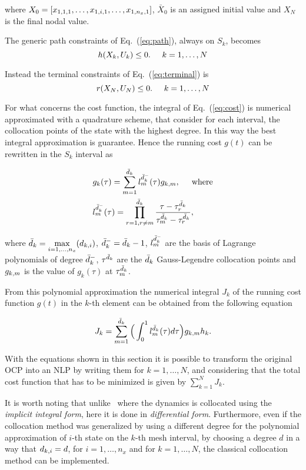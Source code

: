 where $X_0 = [x_{1,1,1}, \dots, x_{1,i,1}, \dots, x_{1,n_{x},1}]$, $\bar{X}_{0}$ is an assigned initial value and $X_{N}$ is the final nodal value.
 
 
The generic path constraints of Eq.~(\ref{eq:path}), always on $S_k$, becomes
\begin{equation}\label{eq:nlpath}
h(X_k, U_k) \leq 0. \hspace{5mm} k = 1, \dots, N
\end{equation}

Instead the terminal constraints of Eq.~(\ref{eq:terminal}) is
\begin{equation}\label{eq:npterminal}
	r(X_N, U_N) \leq 0. \hspace{5mm} k = 1, \dots, N
\end{equation}

For what concerns the cost function, the integral of Eq.~(\ref{eq:cost}) is numerical approximated with a quadrature scheme, that consider for each interval, the collocation points of the state with the highest degree. In this way the best integral approximation is guarantee. Hence the running cost $g(t)$ can be rewritten in the $S_k$ interval as

\begin{subequations}
	\begin{align}
	& g_k(\tau) = \sum_{m=1}^{\bar{d}_k} l_{m}^{\bar{d}_{k}^{-}}(\tau)g_{k,m}, \hspace{5mm} \text{where} \label{eq:nlpcost}\\
	&  l_{m}^{\bar{d}_{k}^{-}} (\tau) = \prod_{r=1, r\neq m}^{\bar{d}_k} \dfrac{\tau - \tau^{\bar{d}_{k}}_{r}}{\tau^{\bar{d}_{k}}_{m} - \tau^{\bar{d}_{k}}_{r}}, \label{eq:nlplm}
	\end{align}
\end{subequations}

where $\bar{d}_k = \max\limits_{i= 1, \dots, n_x}(d_{k,i})$, $\bar{d}_k^{-} = \bar{d}_k -1$, $l_{m}^{\bar{d}_{k}^{-}}$ are the basis of Lagrange polynomials of degree $\bar{d}_k^{-}$, $\tau^{\bar{d}_{k}}$ are the $\bar{d}_k$ Gauss-Legendre collocation points and $g_{k,m}$ is the value of $g_k (\tau)$ at $\tau^{\bar{d}_{k}}_{m}$.

From this polynomial approximation the numerical integral $J_k$ of the running cost function $g(t)$ in the $k$-th element can be obtained from the following equation

\begin{equation}\label{eq:nlpcostk}
	J_k = \sum_{m=1}^{\bar{d}_k}\Big(\int_{0}^{1}l_{m}^{\bar{d}_{k}}(\tau)d\tau\Big)g_{k,m} h_{k}.
\end{equation}

With the equations shown in this section it is possible to transform the original OCP into an NLP by writing them for $k = 1, \dots, N$, and considering that the total cost function that has to be minimized is given by $\sum_{k=1}^{N}J_k$.

It is worth noting that unlike~\cite{Patterson:OCAM:2015} where the dynamics is collocated using the \emph{implicit integral form}, here it is done in \emph{differential form}.
Furthermore, even if the collocation method was generalized by using a different degree for the polynomial approximation of $i$-th state on the $k$-th mesh interval, by choosing a degree $d$ in a way that $d_{k,i} = d$, for $i = 1, \dots, n_x$ and for $k = 1, \dots, N$, the classical collocation method can be implemented.
